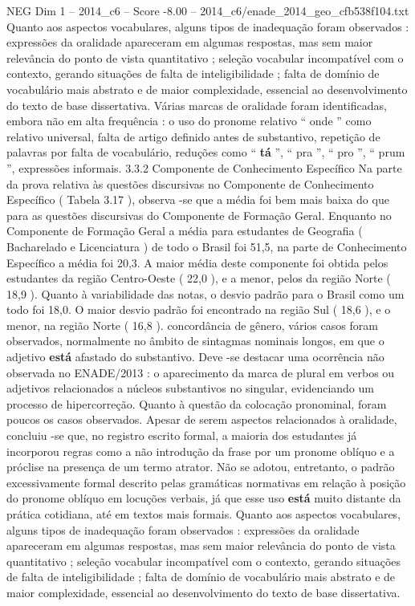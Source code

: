 \begin{textsample}{NEG Dim 1 – 2014\_c6 – Score -8.00 – 2014\_c6/enade\_2014\_geo\_cfb538f104.txt}
Quanto aos aspectos vocabulares, alguns tipos de inadequação foram observados : expressões da oralidade apareceram em algumas respostas, mas sem maior relevância do ponto de vista quantitativo ; seleção vocabular incompatível com o contexto, gerando situações de falta de inteligibilidade ; falta de domínio de vocabulário mais abstrato e de maior complexidade, essencial ao desenvolvimento do texto de base dissertativa.
Várias marcas de oralidade foram identificadas, embora não em alta frequência : o uso do pronome relativo “ onde ” como relativo universal, falta de artigo definido antes de substantivo, repetição de palavras por falta de vocabulário, reduções como “ \textbf{tá} ”, “ pra ”, “ pro ”, “ prum ”, expressões informais. 3.3.2 Componente de Conhecimento Específico Na parte da prova relativa às questões discursivas no Componente de Conhecimento Específico ( Tabela 3.17 ), observa -se que a média foi bem mais baixa do que para as questões discursivas do Componente de Formação Geral.
Enquanto no Componente de Formação Geral a média para estudantes de Geografia ( Bacharelado e Licenciatura ) de todo o Brasil foi 51,5, na parte de Conhecimento Específico a média foi 20,3.
A maior média deste componente foi obtida pelos estudantes da região Centro-Oeste ( 22,0 ), e a menor, pelos da região Norte ( 18,9 ).
Quanto à variabilidade das notas, o desvio padrão para o Brasil como um todo foi 18,0.
O maior desvio padrão foi encontrado na região Sul ( 18,6 ), e o menor, na região Norte ( 16,8 ). concordância de gênero, vários casos foram observados, normalmente no âmbito de sintagmas nominais longos, em que o adjetivo \textbf{está} afastado do substantivo.
Deve -se destacar uma ocorrência não observada no ENADE/2013 : o aparecimento da marca de plural em verbos ou adjetivos relacionados a núcleos substantivos no singular, evidenciando um processo de hipercorreção.
Quanto à questão da colocação pronominal, foram poucos os casos observados.
Apesar de serem aspectos relacionados à oralidade, concluiu -se que, no registro escrito formal, a maioria dos estudantes já incorporou regras como a não introdução da frase por um pronome oblíquo e a próclise na presença de um termo atrator.
Não se adotou, entretanto, o padrão excessivamente formal descrito pelas gramáticas normativas em relação à posição do pronome oblíquo em locuções verbais, já que esse uso \textbf{está} muito distante da prática cotidiana, até em textos mais formais.
Quanto aos aspectos vocabulares, alguns tipos de inadequação foram observados : expressões da oralidade apareceram em algumas respostas, mas sem maior relevância do ponto de vista quantitativo ; seleção vocabular incompatível com o contexto, gerando situações de falta de inteligibilidade ; falta de domínio de vocabulário mais abstrato e de maior complexidade, essencial ao desenvolvimento do texto de base dissertativa.

\end{textsample}
